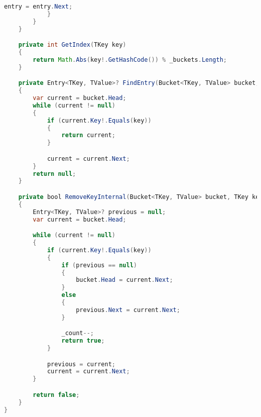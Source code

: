 \documentclass[12pt]{article}
\begin{document}
\begin{lstlisting}[language=Java]
                entry = entry.Next;
            }
        }
    }

    private int GetIndex(TKey key)
    {
        return Math.Abs(key!.GetHashCode()) % _buckets.Length;
    }

    private Entry<TKey, TValue>? FindEntry(Bucket<TKey, TValue> bucket, TKey key)
    {
        var current = bucket.Head;
        while (current != null)
        {
            if (current.Key!.Equals(key))
            {
                return current;
            }

            current = current.Next;
        }
        return null;
    }

    private bool RemoveKeyInternal(Bucket<TKey, TValue> bucket, TKey key)
    {
        Entry<TKey, TValue>? previous = null;
        var current = bucket.Head;

        while (current != null)
        {
            if (current.Key!.Equals(key))
            {
                if (previous == null)
                {
                    bucket.Head = current.Next;
                }
                else
                {
                    previous.Next = current.Next;
                }

                _count--;
                return true;
            }

            previous = current;
            current = current.Next;
        }

        return false;
    }
}

\end{lstlisting}
\end{document}
